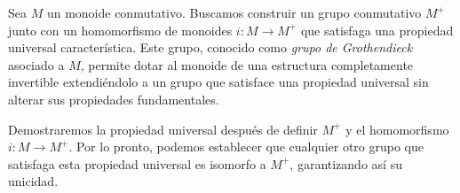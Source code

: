 
Sea \( M \) un monoide conmutativo. Buscamos construir un grupo conmutativo \( M^+ \) junto con un homomorfismo de monoides \( i: M \to M^+ \) que satisfaga una propiedad universal característica. Este grupo, conocido como \emph{grupo de Grothendieck} asociado a \( M \), permite dotar al monoide de una estructura completamente invertible extendiéndolo a un grupo que satisface una propiedad universal sin alterar sus propiedades fundamentales.

\begin{proposicion}
\end{proposicion}

Demostraremos la propiedad universal después de definir \( M^+ \) y el homomorfismo \( i: M \to M^+ \). Por lo pronto, podemos establecer que cualquier otro grupo que satisfaga esta propiedad universal es isomorfo a \( M^+ \), garantizando así su unicidad.




\begin{corolario}
\end{corolario}


